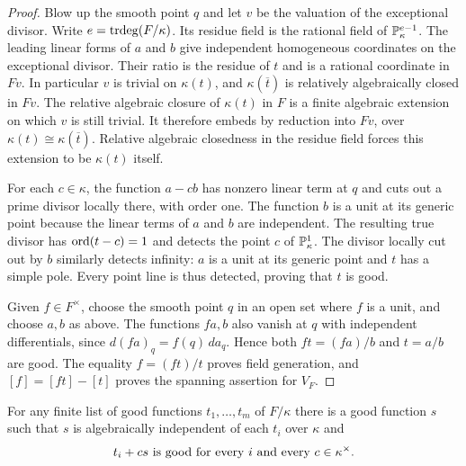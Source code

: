 \begin{proof}
Blow up the smooth point $q$ and let $v$ be the valuation of the
exceptional divisor.  Write $e=\operatorname{trdeg}(F/\kappa)$.  Its residue field is
the rational field of $\mathbb P_\kappa^{e-1}$.  The leading linear forms of
$a$ and $b$ give independent homogeneous coordinates on the exceptional
divisor.  Their ratio is the residue of $t$ and is a rational coordinate
in $Fv$.  In particular $v$ is trivial on $\kappa(t)$, and
$\kappa(\overline t)$ is relatively algebraically closed in $Fv$.
The relative algebraic closure of $\kappa(t)$ in $F$ is a finite
algebraic extension on which $v$ is still trivial.  It therefore embeds
by reduction into $Fv$, over $\kappa(t)\cong\kappa(\overline t)$.
Relative algebraic closedness in the residue field forces this extension
to be $\kappa(t)$ itself.

For each $c\in\kappa$, the function $a-cb$ has nonzero linear term at
$q$ and cuts out a prime divisor locally there, with order one.
The function $b$ is a unit at its generic point because the linear terms
of $a$ and $b$ are independent.  The resulting true divisor has
$\operatorname{ord}(t-c)=1$ and detects the point $c$ of $\mathbb P^1_\kappa$.
The divisor locally cut out by $b$ similarly detects infinity: $a$
is a unit at its generic point and $t$ has a simple pole.  Every point
line is thus detected, proving that $t$ is good.

Given $f\in F^\times$, choose the smooth point $q$ in an open set where
$f$ is a unit, and choose $a,b$ as above.  The functions $fa,b$ also
vanish at $q$ with independent differentials, since
$d(fa)_q=f(q)\,da_q$.  Hence both $ft=(fa)/b$ and $t=a/b$ are good.
The equality $f=(ft)/t$ proves field generation, and
$[f]=[ft]-[t]$ proves the spanning assertion for $V_F$.
\end{proof}

\begin{lemma}
\label{lem:common-partner}
For any finite list of good functions $t_1,\ldots,t_m$ of $F/\kappa$
there is a good function $s$ such that $s$ is algebraically independent
of each $t_i$ over $\kappa$ and
\[
               t_i+cs\ \hbox{is good for every }i
               \hbox{ and every }c\in\kappa^\times.
\]
\end{lemma}

